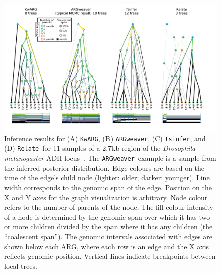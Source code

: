 \documentclass{article}
\newcommand{\tsinfer}[0]{\texttt{tsinfer}}
\newcommand{\kwarg}[0]{\texttt{KwARG}}
\newcommand{\argweaver}[0]{\texttt{ARGweaver}}
\newcommand{\relate}[0]{\texttt{Relate}}
\begin{document}

\begin{figure} \begin{center}
\includegraphics[width=\textwidth]{illustrations/inference.pdf} \end{center}
\caption{\label{fig-inferred-args} Inference results for
(A) \kwarg, (B) \argweaver, (C) \tsinfer,
and (D) \relate\
for 11 samples of a 2.7kb region of the \textit{Drosophila melanogaster} ADH
locus~\citep{kreitman1983nucleotide}.
The \argweaver\ example
is a sample from the inferred posterior distribution.
Edge colours are based on the time of the edge's child node
(lighter: older; darker: younger).
Line width corresponds to the genomic span of the edge.
Position on the X and Y axes for the graph visualization is arbitrary.
 Node colour
refers to the number of parents of the node.
The fill colour intensity of a node is determined by the genomic span over which
it has two or more children divided by the span where it has any
children (the ``coalescent span'').
The genomic intervals associated with edges are shown below
each ARG, where each row is an edge
and the X axis reflects genomic position.
Vertical lines indicate breakpoints between local trees.
}
\end{figure}
\end{document}
